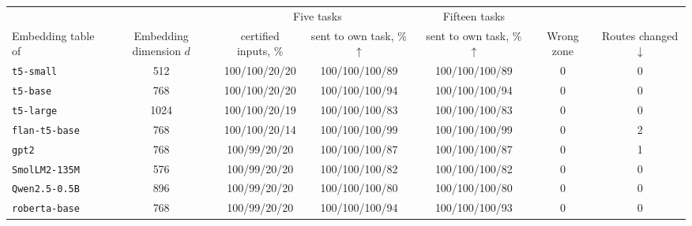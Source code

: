 \begin{tabular}{lcccccc}
    \toprule
    & & \multicolumn{2}{c}{Five tasks} & Fifteen tasks & & \\
    \cmidrule(lr){3-4} \cmidrule(lr){5-5}
    Embedding table of & \shortstack[c]{Embedding\\dimension\\$d$} & \shortstack[c]{certified\\inputs, \%} & \shortstack[c]{sent to\\own task,\\\% $\uparrow$} & \shortstack[c]{sent to\\own task,\\\% $\uparrow$} & Wrong zone & \shortstack[c]{Routes\\changed\\$\downarrow$} \\
    \midrule
    \texttt{t5-small} & 512 & 100/100/20/20 & 100/100/100/89 & 100/100/100/89 & 0 & 0 \\
    \texttt{t5-base} & 768 & 100/100/20/20 & 100/100/100/94 & 100/100/100/94 & 0 & 0 \\
    \texttt{t5-large} & 1024 & 100/100/20/19 & 100/100/100/83 & 100/100/100/83 & 0 & 0 \\
    \texttt{flan-t5-base} & 768 & 100/100/20/14 & 100/100/100/99 & 100/100/100/99 & 0 & 2 \\
    \texttt{gpt2} & 768 & 100/99/20/20 & 100/100/100/87 & 100/100/100/87 & 0 & 1 \\
    \texttt{SmolLM2-135M} & 576 & 100/99/20/20 & 100/100/100/82 & 100/100/100/82 & 0 & 0 \\
    \texttt{Qwen2.5-0.5B} & 896 & 100/99/20/20 & 100/100/100/80 & 100/100/100/80 & 0 & 0 \\
    \texttt{roberta-base} & 768 & 100/99/20/20 & 100/100/100/94 & 100/100/100/93 & 0 & 0 \\
    \bottomrule
\end{tabular}
